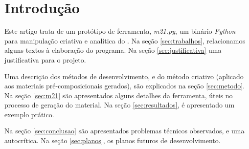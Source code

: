 \section{Introdução}

Este artigo trata de um protótipo de ferramenta, \emph{m21.py}, um binário \emph{Python} para manipulação criativa e analítica do \cite{music21_2015}. Na seção \ref{sec:trabalhos}, relacionamos alguns textos à elaboração do programa. Na seção \ref{sec:justificativa} uma justificativa para o projeto. 

Uma descrição dos métodos de desenvolvimento, e do método criativo (aplicado aos materiais pré-composicionais gerados), são explicados na seção \ref{sec:metodo}. Na seção \ref{sec:m21} são apresentados alguns detalhes da ferramenta, úteis no processo de geração do material. Na seção \ref{sec:resultados}, é apresentado um exemplo prático. 

Na seção \ref{sec:conclusao} são apresentados problemas técnicos observados, e uma autocrítica. Na seção \ref{sec:planos}, os planos futuros de desenvolvimento.